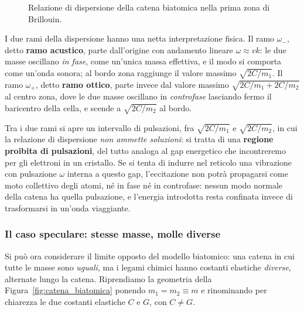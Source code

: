 \begin{figure}[htbp]
    \caption{Relazione di dispersione della catena biatomica nella prima zona di Brillouin.}
    \label{fig:dispersione_biatomica}
\end{figure}

I due rami della dispersione hanno una netta interpretazione fisica. Il ramo \( \omega_{-} \), detto \textbf{ramo acustico}, parte dall'origine con andamento lineare \( \omega \approx v k \): le due masse oscillano \emph{in fase}, come un'unica massa effettiva, e il modo si comporta come un'onda sonora; al bordo zona raggiunge il valore massimo \( \sqrt{2C/m_1} \). Il ramo \( \omega_{+} \), detto \textbf{ramo ottico}, parte invece dal valore massimo \( \sqrt{2C/m_1 + 2C/m_2} \) al centro zona, dove le due masse oscillano in \emph{controfase} lasciando fermo il baricentro della cella, e scende a \( \sqrt{2C/m_2} \) al bordo.

Tra i due rami si apre un intervallo di pulsazioni, fra \( \sqrt{2C/m_1} \) e \( \sqrt{2C/m_2} \), in cui la relazione di dispersione \emph{non ammette soluzioni}: si tratta di una \textbf{regione proibita di pulsazioni}, del tutto analoga al gap energetico che incontreremo per gli elettroni in un cristallo. Se si tenta di indurre nel reticolo una vibrazione con pulsazione \( \omega \) interna a questo gap, l'eccitazione non potrà propagarsi come moto collettivo degli atomi, né in fase né in controfase: nessun modo normale della catena ha quella pulsazione, e l'energia introdotta resta confinata invece di trasformarsi in un'onda viaggiante.

\subsubsection{Il caso speculare: stesse masse, molle diverse}

Si può ora considerare il limite opposto del modello biatomico: una catena in cui tutte le masse sono \emph{uguali}, ma i legami chimici hanno costanti elastiche \emph{diverse}, alternate lungo la catena. Riprendiamo la geometria della Figura~\ref{fig:catena_biatomica} ponendo \( m_1 = m_2 \equiv m \) e rinominando per chiarezza le due costanti elastiche \( C \) e \( G \), con \( C \neq G \).

